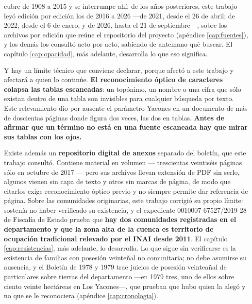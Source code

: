 cubre de 1908 a 2015 y se interrumpe ahí; de los años posteriores, este trabajo leyó edición por edición los de 2016 a 2026 ---de 2021, desde el 26 de abril; de 2022, desde el 6 de enero, y de 2026, hasta el 21 de septiembre---, sobre los archivos por edición que reúne el repositorio del proyecto (apéndice \ref{cap:fuentes}), y los demás los consultó acto por acto, sabiendo de antemano qué buscar. El capítulo \ref{cap:opacidad}, más adelante, desarrolla lo que eso significa.

Y hay un límite técnico que conviene declarar, porque afectó a este trabajo y afectará a quien lo continúe. \textbf{El reconocimiento óptico de caracteres colapsa las tablas escaneadas}: un topónimo, un nombre o una cifra que sólo existan dentro de una tabla son invisibles para cualquier búsqueda por texto. Este relevamiento dio por ausente el parámetro Yacones en un documento de más de doscientas páginas donde figura dos veces, las dos en tablas. \textbf{Antes de afirmar que un término no está en una fuente escaneada hay que mirar sus tablas con los ojos.}

Existe además un \textbf{repositorio digital de anexos} separado del boletín, que este trabajo consultó. Contiene material en volumen --- trescientas veintiséis páginas sólo en octubre de 2017 --- pero sus archivos llevan extensión de PDF sin serlo, algunos vienen sin capa de texto y otros sin marcas de página, de modo que citarlos exige reconocimiento óptico previo y no siempre permite dar referencia de página. Sobre las comunidades originarias, este trabajo corrigió su propio límite: sostenía no haber verificado su existencia, y el expediente 0010007-67527/2019-28 de Fiscalía de Estado prueba que \textbf{hay dos comunidades registradas en el departamento y que la zona alta de la cuenca es territorio de ocupación tradicional relevado por el INAI desde 2011}. El capítulo \ref{cap:resistencias}, más adelante, lo desarrolla. Lo que sigue sin verificarse es la existencia de familias con posesión veinteñal no comunitaria; no debe asumirse su ausencia, y el Boletín de 1978 y 1979 trae juicios de posesión veinteañal de particulares sobre tierras del departamento ---en 1979 tres, uno de ellos sobre ciento veinte hectáreas en Los Yacones---, que prueban que hubo quien la alegó y no que se le reconociera (apéndice \ref{cap:cronologia}).
